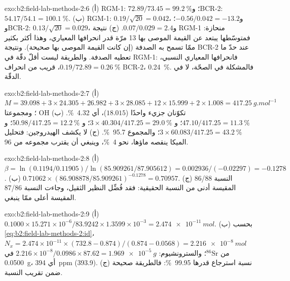 \begin{solution}{exo:b2:field-lab-methods-2:6}
(أ) RGM-1: $72.89/73.45 = \qty{99.2}{\percent}$؛ وBCR-2: $54.17/54.1 = \qty{100.1}{\percent}$.
(ب) RGM-1: $0.19/\sqrt{20} = 0.042$، و$-0.56/0.042 = -13.2$؛ وBCR-2: $0.13/\sqrt{20} = 0.029$،
و$0.07/0.029 = 2.4$. (ج) نتيجة RGM-1 منحازة: فمتوسّطها يبتعد عن القيمة الموصى بها 13 مرّة قدر
انحرافها المعياري، وهذا أكثر بكثير ممّا تسمح به الصدفة (إن كانت القيمة الموصى بها صحيحة). ونتيجة BCR-2 عند
حدّ ما تعطيه الصدفة. والطريقة ليست أقلّ دقّة في RGM-1: فانحرافها المعياري النسبي،
$0.19/72.89 = \qty{0.26}{\percent}$، قريب من انحراف BCR-2، \qty{0.24}{\percent}. فالمشكلة في
الصحّة، لا في الدقّة.
\end{solution}

\begin{solution}{exo:b2:field-lab-methods-2:7}
(أ) $M = 39.098 + 3 \times 24.305 + 26.982 + 3 \times 28.085 + 12 \times 15.999 + 2 \times 1.008 =
\qty{417.25}{g.mol^{-1}}$؛ ومجموعتا OH تكوّنان جزيء  واحدًا ($18.015$)، أي \qty{4.32}{\percent}.
(ب)  $47.10/417.25 = \qty{11.3}{\percent}$؛ و $3 \times 40.304/417.25 =
\qty{29.0}{\percent}$؛ و $50.98/417.25 = \qty{12.2}{\percent}$؛ و $3 \times
60.083/417.25 = \qty{43.2}{\percent}$؛ والمجموع \qty{95.7}{\percent}. (ج) لا يكشف 
الهيدروجين: فتحليل الميكا ينقصه ماؤها، نحو \qty{4}{\percent}، وينبغي أن يقترب مجموعه من
96.
\end{solution}

\begin{solution}{exo:b2:field-lab-methods-2:8}
(أ) $\beta = \ln(0.1194/0.11905)/\ln(85.909261/87.905612) = 0.002936/(-0.02297) = -0.1278$.
(ب) $0.71062 \times (86.908878/85.909261)^{-0.1278} = 0.70957$. (ج) النسبة 86/88 المقيسة أدنى من
النسبة الحقيقية: فقد فُضِّل النظير الثقيل، وجاءت النسبة 87/86 المقيسة أعلى ممّا ينبغي.
\end{solution}

\begin{solution}{exo:b2:field-lab-methods-2:9}
(أ) $0.1000 \times 15.271 \times 10^{-6}/83.9242 \times 1.3599 \times 10^{-3} = \qty{2.474e-11}{mol}$.
(ب) بحسب \eqref{eq:b2:field-lab-methods-2:id}، $N_x = 2.474 \times 10^{-11} \times (732.8 -
0.874)/(0.874 - 0.0568) = \qty{2.216e-8}{mol}$ من $^{86}\mathrm{Sr}$؛ والسترونشيوم: $2.216 \times
10^{-8}/0.0986 \times 87.62 = \qty{1.969e-5}{g}$ في \qty{0.0500}{g}، أي \qty{394}{ppm} (393.9).
(ج) نسبة استرجاع قدرها \qty{99.95}{\percent}: فالطريقة صحيحة ضمن تقريب النسبة.
\end{solution}

